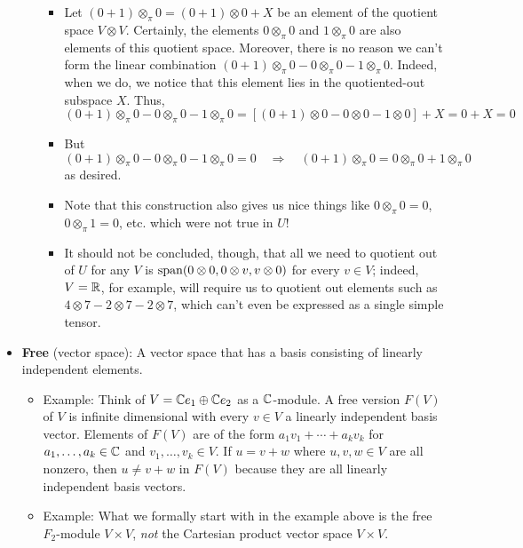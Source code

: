 \documentclass[../notes.tex]{subfiles}
\begin{document}
\begin{itemize}
\begin{itemize}
\begin{itemize}
            \item Let $(0+1)\otimes_\pi 0=(0+1)\otimes 0+X$ be an element of the quotient space $V\otimes V$. Certainly, the elements $0\otimes_\pi 0$ and $1\otimes_\pi 0$ are also elements of this quotient space. Moreover, there is no reason we can't form the linear combination $(0+1)\otimes_\pi 0-0\otimes_\pi 0-1\otimes_\pi 0$. Indeed, when we do, we notice that this element lies in the quotiented-out subspace $X$. Thus,
            \begin{equation*}
                (0+1)\otimes_\pi 0-0\otimes_\pi 0-1\otimes_\pi 0 = [(0+1)\otimes 0-0\otimes 0-1\otimes 0]+X
                = 0+X
                = 0
            \end{equation*}
            \item But
            \begin{equation*}
                (0+1)\otimes_\pi 0-0\otimes_\pi 0-1\otimes_\pi 0 = 0
                \quad\Longrightarrow\quad
                (0+1)\otimes_\pi 0 = 0\otimes_\pi 0+1\otimes_\pi 0
            \end{equation*}
            as desired.
            \item Note that this construction also gives us nice things like $0\otimes_\pi 0=0$, $0\otimes_\pi 1=0$, etc. which were not true in $U$!
            \item It should not be concluded, though, that all we need to quotient out of $U$ for any $V$ is $\operatorname{span}(0\otimes 0,0\otimes v,v\otimes 0)$ for every $v\in V$; indeed, $V=\mathbb{R}$, for example, will require us to quotient out elements such as $4\otimes 7-2\otimes 7-2\otimes 7$, which can't even be expressed as a single simple tensor.
        \end{itemize}
    \end{itemize}
    \item \textbf{Free} (vector space): A vector space that has a basis consisting of linearly independent elements.
    \begin{itemize}
        \item Example: Think of $V=\mathbb{C} e_1\oplus\mathbb{C} e_2$ as a $\mathbb{C}$-module. A free version $F(V)$ of $V$ is infinite dimensional with every $v\in V$ a linearly independent basis vector. Elements of $F(V)$ are of the form $a_1v_1+\cdots+a_kv_k$ for $a_1,\dots,a_k\in\mathbb{C}$ and $v_1,\dots,v_k\in V$. If $u=v+w$ where $u,v,w\in V$ are all nonzero, then $u\neq v+w$ in $F(V)$ because they are all linearly independent basis vectors.
        \item Example: What we formally start with in the example above is the free $F_2$-module $V\times V$, \emph{not} the Cartesian product vector space $V\times V$.

\end{itemize}
\end{itemize}
\end{document}
